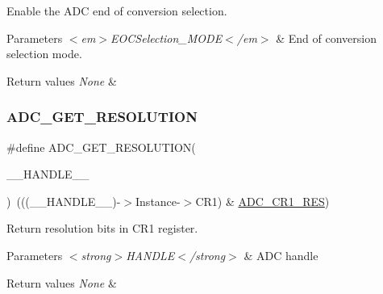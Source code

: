 Enable the A\+DC end of conversion selection. 


\begin{DoxyParams}{Parameters}
{\em $<$em$>$\+E\+O\+C\+Selection\+\_\+\+M\+O\+D\+E$<$/em$>$} & End of conversion selection mode. \\
\hline
\end{DoxyParams}

\begin{DoxyRetVals}{Return values}
{\em None} & \\
\hline
\end{DoxyRetVals}
\mbox{\label{group___a_d_c___private___macros_gae2da95074db4dd0418c1dd1f13ad7970}} 
\subsubsection{\texorpdfstring{ADC\_GET\_RESOLUTION}{ADC\_GET\_RESOLUTION}}
{\footnotesize\ttfamily \#define A\+D\+C\+\_\+\+G\+E\+T\+\_\+\+R\+E\+S\+O\+L\+U\+T\+I\+ON(\begin{DoxyParamCaption}\item[{}]{\+\_\+\+\_\+\+H\+A\+N\+D\+L\+E\+\_\+\+\_\+ }\end{DoxyParamCaption})~(((\+\_\+\+\_\+\+H\+A\+N\+D\+L\+E\+\_\+\+\_\+)-\/$>$Instance-\/$>$C\+R1) \& \mbox{\hyperlink{group___peripheral___registers___bits___definition_ga71e4a4c233895a2e7b6dd3ca6ca849e5}{A\+D\+C\+\_\+\+C\+R1\+\_\+\+R\+ES}})}



Return resolution bits in C\+R1 register. 


\begin{DoxyParams}{Parameters}
{\em $<$strong$>$\+H\+A\+N\+D\+L\+E$<$/strong$>$} & A\+DC handle \\
\hline
\end{DoxyParams}

\begin{DoxyRetVals}{Return values}
{\em None} & \\
\hline
\end{DoxyRetVals}
\mbox{\label{group___a_d_c___private___macros_gafe3a7a04ff078c62ae98b19403f696c7}} 
